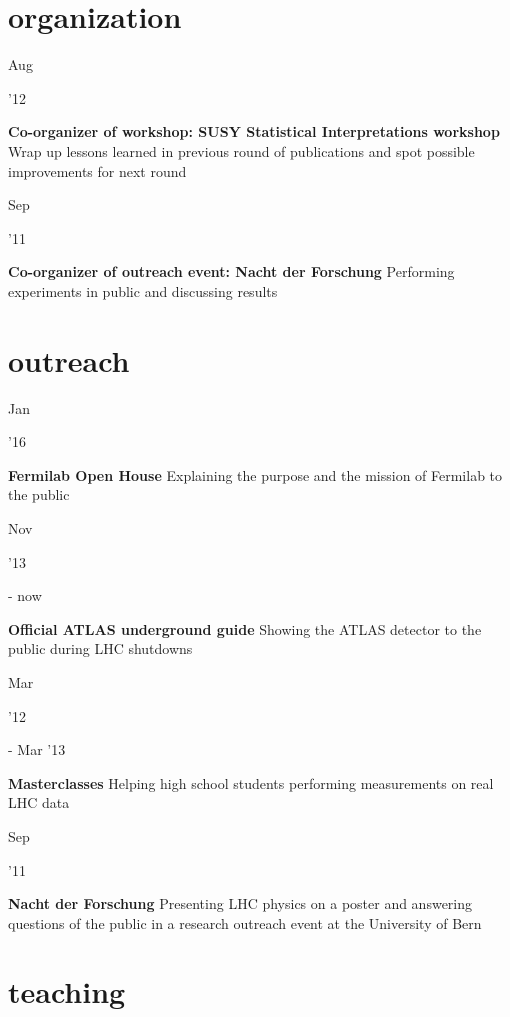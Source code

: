 \documentclass[]{cv} %
\begin{document}
\section{organization}

\begin{entrylist}

  \entry
  {\parbox[t]{\parboxWidthOne}{Aug}\parbox[t]{\parboxWidthTwo}{\hfill '12}}
  {\textbf{Co-organizer of workshop: SUSY Statistical Interpretations workshop}}
  {}
  {Wrap up lessons learned in previous round of publications and spot possible
  improvements for next round}

  \entry
  {\parbox[t]{\parboxWidthOne}{Sep}\parbox[t]{\parboxWidthTwo}{\hfill '11}}
  {\textbf{Co-organizer of outreach event: Nacht der Forschung}}
  {}
  {Performing experiments in public and discussing results}

\end{entrylist}

\section{outreach}

\begin{entrylist}

  \entry
  {\parbox[t]{\parboxWidthOne}{Jan}\parbox[t]{\parboxWidthTwo}{\hfill '16}}
  {\textbf{Fermilab Open House}}
  {}
  {Explaining the purpose and the mission of Fermilab to the public}

  \entry
  {\parbox[t]{\parboxWidthOne}{Nov}\parbox[t]{\parboxWidthTwo}{\hfill '13} - now}
  {\textbf{Official ATLAS underground guide}}
  {}
  {Showing the ATLAS detector to the public during LHC shutdowns}

  \entry
  {\parbox[t]{\parboxWidthOne}{Mar}\parbox[t]{\parboxWidthTwo}{\hfill '12} - Mar
'13}
  {\textbf{Masterclasses}}
  {}
  {Helping high school students performing measurements on real LHC data}

  \entry
  {\parbox[t]{\parboxWidthOne}{Sep}\parbox[t]{\parboxWidthTwo}{\hfill '11}}
  {\textbf{Nacht der Forschung}}
  {}
  {Presenting LHC physics on a poster and answering questions of the public in a
  research outreach event at the University of Bern}

\end{entrylist}

\newpage
\section{teaching}
\end{document}
